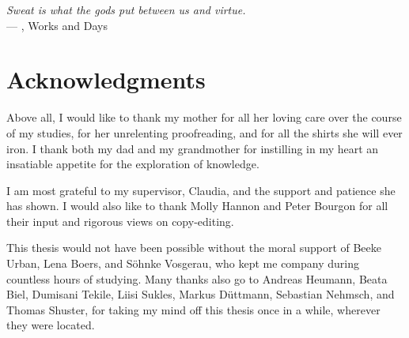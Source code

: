 
\begin{flushright}{\slshape    
    Sweat is what the gods put between us and virtue.} \\ \medskip
    --- , Works and Days
\end{flushright}



\bigskip

\begingroup
\let\clearpage\relax
\let\cleardoublepage\relax
\let\cleardoublepage\relax
\chapter*{Acknowledgments}

Above all, I would like to thank my mother for all her loving care over the course of my studies, for her unrelenting proofreading, and for all the shirts she will ever iron.
I thank both my dad and my grandmother for instilling in my heart an insatiable appetite for the exploration of knowledge. 

I am most grateful to my supervisor, Claudia, and the support and patience she has shown.
I would also like to thank Molly Hannon and Peter Bourgon for all their input and rigorous views on copy-editing.

This thesis would not have been possible without the moral support of Beeke Urban, Lena Boers, and S\"ohnke Vosgerau, who kept me company during countless hours of studying.
Many thanks also go to Andreas Heumann, Beata Biel, Dumisani Tekile, Liisi Sukles, Markus D\"uttmann, Sebastian Nehmsch, and Thomas Shuster, for taking my mind off this thesis once in a while,  wherever they were located.

\endgroup



